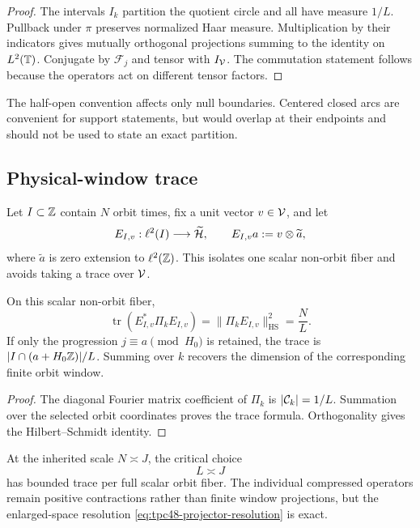 \begin{proof}
The intervals \(I_k\) partition the quotient circle and all have
measure \(1/L\).  Pullback under \(\pi\) preserves normalized Haar
measure.  Multiplication by their indicators gives mutually orthogonal
projections summing to the identity on \(L^2(\mathbb T)\).  Conjugate by
\(\mathscr F_j\) and tensor with \(I_\mathcal V\).  The commutation statement
follows because the operators act on different tensor factors.
\end{proof}

The half-open convention affects only null boundaries.  Centered closed
arcs are convenient for support statements, but would overlap at their
endpoints and should not be used to state an exact partition.

\subsection{Physical-window trace}

Let \(I\subset\mathbb Z\) contain \(N\) orbit times, fix a unit vector
\(v\in\mathcal V\), and let
\begin{equation}
 E_{I,v}:\ell^2(I)\longrightarrow\widetilde{\mathcal H},
 \qquad
 E_{I,v}a:=v\otimes\widetilde a,
 \label{eq:tpc48-scalar-fiber-inclusion}
\end{equation}
where \(\widetilde a\) is zero extension to \(\ell^2(\mathbb Z)\).  This
isolates one scalar non-orbit fiber and avoids taking a trace over
\(\mathcal V\).

\begin{theorem}
\label{thm:tpc48-band-trace}
On this scalar non-orbit fiber,
\begin{equation}
 \boxed{
 \operatorname{tr}(E_{I,v}^*\Pi_kE_{I,v})
 =\|\Pi_kE_{I,v}\|_{\mathrm{HS}}^2
 =\frac NL.}
 \label{eq:tpc48-band-trace}
\end{equation}
If only the progression \(j\equiv a\pmod{H_0}\) is retained, the
trace is \(|I\cap(a+H_0\mathbb Z)|/L\).  Summing over \(k\) recovers the
dimension of the corresponding finite orbit window.
\end{theorem}

\begin{proof}
The diagonal Fourier matrix coefficient of \(\Pi_k\) is
\(|\mathcal C_k|=1/L\).  Summation over the selected orbit coordinates proves
the trace formula.  Orthogonality gives the Hilbert--Schmidt identity.
\end{proof}

At the inherited scale \(N\asymp J\), the critical choice
\begin{equation}
 L\asymp J
 \label{eq:tpc48-critical-L}
\end{equation}
has bounded trace per full scalar orbit fiber.  The individual
compressed operators remain positive contractions rather than finite
window projections, but the enlarged-space resolution
\eqref{eq:tpc48-projector-resolution} is exact.


